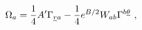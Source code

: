 \begin{equation}
\Omega_a = {1\over 4} A' \Gamma_{{\underline r} a} -
{1\over 4} e^{B/2} W_{ab}
\Gamma^{b\underline\theta}~,
\end{equation}

